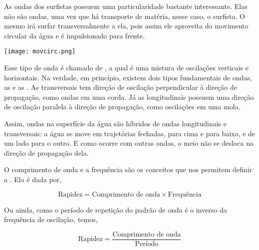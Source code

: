 \documentclass[book, 12pt, twoside, a5paper, english, brazil, sumario=tradicional, openany]{abntex2}
\begin{document}
As ondas dos surfistas possuem uma particularidade bastante interessante. Elas não são ondas, uma vez que há transporte de matéria, nesse caso, o surfista. O mesmo irá surfar transversalmente a ela, pois assim ele aproveita do movimento circular da água e é impulsionado para frente.

\vspace{0.2cm}
\begin{center}
    \texttt{[image: movcirc.png]} 
\end{center}
\vspace{-0.6cm}

Esse tipo de onda é chamado de {\color{celestialblue}{onda mista}}, a qual é uma mistura de oscilações verticais e horizontais. Na verdade, em princípio, existem dois tipos fundamentais de ondas, as {\color{celestialblue}{transversais}} e as {\color{celestialblue}{longitudinais}}. As transversais tem direção de oscilação perpendicular à direção de propagação, como ondas em uma corda. Já as longitudinais possuem uma direção de oscilação paralela à direção de propagação, como oscilações em uma mola.

Assim, ondas na superfície da água são híbridos de ondas longitudinais e transversais: a água se move em trajetórias fechadas, para cima e para baixo, e de um lado para o outro. E como ocorre com outras ondas, o meio não se desloca na direção de propagação dela.

\vspace{-0.7cm}

{}

\vspace{-0.3cm}

O comprimento de onda e a frequência são os conceitos que nos permitem definir a {\color{celestialblue}{rapidez de uma onda}}. Ela é dada por, 

\vspace{-0.5cm}

\begin{equation}
    \text{Rapidez} = \text{Comprimento de onda} \times \text{Frequência} 
\end{equation}

Ou ainda, como o período de repetição do padrão de onda é o inverso da frequência de oscilação, temos,

\begin{equation}
    \text{Rapidez} = \dfrac{\text{Comprimento de onda}}{\text{Período}} 
\end{equation}
\end{document}
